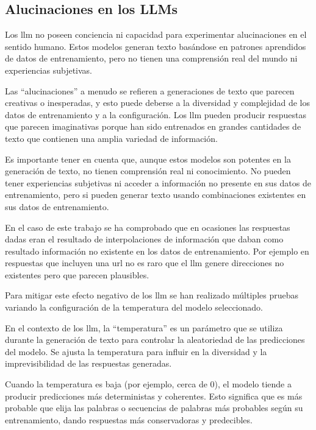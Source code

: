 \subsection{Alucinaciones en los LLMs}

Los \acrlong{llm} no poseen conciencia ni capacidad para experimentar alucinaciones en el sentido humano. Estos modelos generan texto basándose en patrones aprendidos de datos de entrenamiento, pero no tienen una comprensión real del mundo ni experiencias subjetivas.

Las ``alucinaciones'' a menudo se refieren a generaciones de texto que parecen creativas o inesperadas, y esto puede deberse a la diversidad y complejidad de los datos de entrenamiento y a la configuración. Los \acrshort{llm} pueden producir respuestas que parecen imaginativas porque han sido entrenados en grandes cantidades de texto que contienen una amplia variedad de información.

Es importante tener en cuenta que, aunque estos modelos son potentes en la generación de texto, no tienen comprensión real ni conocimiento. No pueden tener experiencias subjetivas ni acceder a información no presente en sus datos de entrenamiento, pero si pueden generar texto usando combinaciones existentes en sus datos de entrenamiento.

En el caso de este trabajo se ha comprobado que en ocasiones las respuestas dadas eran el resultado de interpolaciones de información que daban como resultado información no existente en los datos de entrenamiento. Por ejemplo en respuestas que incluyen una \acrshort{url} no es raro que el \acrshort{llm} genere direcciones no existentes pero que parecen plausibles. 

Para mitigar este efecto negativo de los \acrshort{llm} se han realizado múltiples pruebas variando la configuración de la temperatura del modelo seleccionado. 

En el contexto de los \acrshort{llm}, la ``temperatura'' es un parámetro que se utiliza durante la generación de texto para controlar la aleatoriedad de las predicciones del modelo. Se ajusta la temperatura para influir en la diversidad y la imprevisibilidad de las respuestas generadas.

Cuando la temperatura es baja (por ejemplo, cerca de 0), el modelo tiende a producir predicciones más deterministas y coherentes. Esto significa que es más probable que elija las palabras o secuencias de palabras más probables según su entrenamiento, dando respuestas más conservadoras y predecibles.

